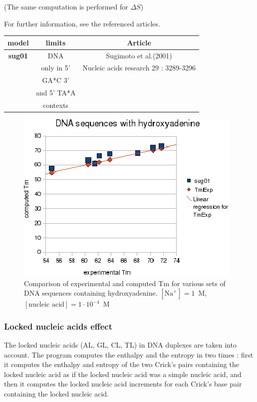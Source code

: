 \documentclass{article}
\begin{document}
       (The same computation is performed for $\Delta S$) 
       
For further information, see the referenced articles.

\begin{table}[h][c]
\begin{tabular}[h]{| c | c | c |}
\textbf{model} & \textbf{limits} & \textbf{Article} \\
\hline
\textbf{sug01} & DNA & Sugimoto et al.(2001)\\
 & only in 5' & Nucleic acids research 29 : 3289-3296\\
 & GA*C 3' & \\
 & and 5' TA*A & \\
 & contexts & \\
 \hline
\end{tabular}
\end{table}

\begin{figure}[h]
\includegraphics[width=1\linewidth]{images/Hydroxyadenine}
\caption{Comparison of experimental and computed Tm for various sets of
 DNA sequences containing hydroxyadenine. $[\mbox{Na}^+] = 1$~M, $[\mbox{nucleic acid}] = 1\cdot{}10^{-4}$~M}
\end{figure}

\subsubsection{Locked nucleic acids effect}

The locked nucleic acids (AL, GL, CL, TL) in DNA duplexes are taken into account.
The program computes the enthalpy and the entropy in two times : first it computes the enthalpy and entropy of 
the two Crick's pairs containing the locked nucleic acid as if the locked nucleic acid was a simple nucleic acid,
and then it computes the locked nucleic acid increments for each Crick's base pair containing the locked nucleic acid.
\end{document}
